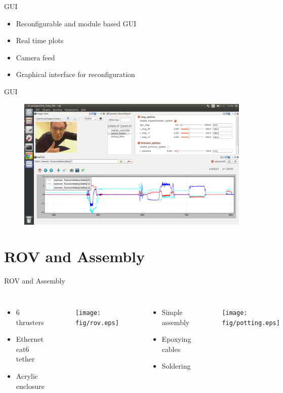 \documentclass[11pt]{beamer}
\begin{document}
\begin{frame}{GUI}
\begin{itemize}
\item Reconfigurable and module based GUI
\item Real time plots
\item Camera feed
\item Graphical interface for reconfiguration
\end{itemize}
\end{frame}

\begin{frame}{GUI}
\begin{figure}
\includegraphics[width=1\textwidth]{fig/GUI2.png}
\end{figure}
\end{frame}
\section{ROV and Assembly}
\begin{frame}{ROV and Assembly}
\begin{columns}[c] 
\begin{itemize}
\item 6 thrusters
\item Ethernet cat6 tether
\item Acrylic enclosure
\end{itemize}
\begin{figure}
\texttt{[image: fig/rov.eps]}
\end{figure}
\begin{itemize}
\item Simple assembly
\item Epoxying cables
\item Soldering
\end{itemize}
\begin{figure}
\texttt{[image: fig/potting.eps]}
\end{figure}
\end{columns}
\end{frame}
\end{document}
